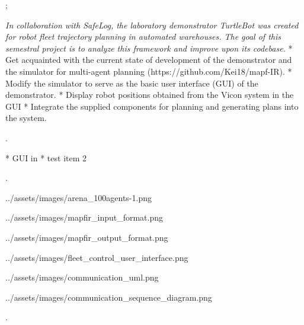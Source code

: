 

\worktype[B/EN]
\slideshow



\pg;


\textit {
    In collaboration with SafeLog, the laboratory demonstrator TurtleBot was created
    for robot fleet trajectory planning in automated warehouses. The goal of this semestral
    project is to analyze this framework and improve upon its codebase.
}
\begitems
* Get acquainted with the current state of development of the demonstrator and the simulator for multi-agent planning (https://github.com/Kei18/mapf-IR).
* Modify the simulator to serve as the basic user interface (GUI) of the demonstrator.
* Display robot positions obtained from the Vicon system in the GUI
* Integrate the supplied components for planning and generating plans into the system.
\enditems
\nl

\pg.





\begitems
* GUI in 
* test item 2
\enditems
\nl

\pg.

\centerline{\picw=14cm \inspic ../assets/images/arena_100agents-1.png }


\centerline{\picw=5cm \inspic ../assets/images/mapfir_input_format.png }
\centerline{\picw=5cm \inspic ../assets/images/mapfir_output_format.png }


\centerline{\picw=5cm \inspic ../assets/images/fleet_control_user_interface.png }


\centerline{\picw=5cm \inspic ../assets/images/communication_uml.png}


\centerline{\picw=5cm \inspic ../assets/images/communication_sequence_diagram.png}


\pg.